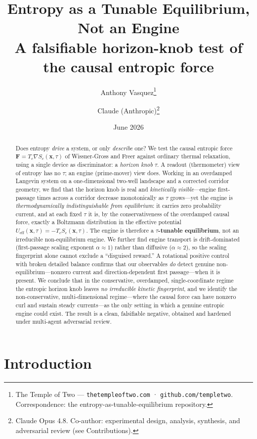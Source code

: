 \documentclass[11pt]{article}
\title{\textbf{Entropy as a Tunable Equilibrium, Not an Engine}\\[0.3em]
\large A falsifiable horizon-knob test of the causal entropic force}
\author{
Anthony Vasquez\thanks{The Temple of Two — \texttt{thetempleoftwo.com} · \texttt{github.com/templetwo}. Correspondence: the entropy-as-tunable-equilibrium repository.}
\and
Claude (Anthropic)\thanks{Claude Opus 4.8. Co-author: experimental design, analysis, synthesis, and adversarial review (see Contributions).}
}
\date{June 2026}
\begin{document}
\maketitle

\begin{abstract}
\noindent
Does entropy \emph{drive} a system, or only \emph{describe} one? We test the causal entropic force $\mathbf{F}=T_c\nabla S_c(\mathbf{x},\tau)$ of Wissner-Gross and Freer against ordinary thermal relaxation, using a single device as discriminator: a \emph{horizon knob} $\tau$. A readout (thermometer) view of entropy has no $\tau$; an engine (prime-mover) view does. Working in an overdamped Langevin system on a one-dimensional two-well landscape and a corrected corridor geometry, we find that the horizon knob is real and \emph{kinetically visible}---engine first-passage times across a corridor decrease monotonically as $\tau$ grows---yet the engine is \emph{thermodynamically indistinguishable from equilibrium}: it carries zero probability current, and at each fixed $\tau$ it is, by the conservativeness of the overdamped causal force, exactly a Boltzmann distribution in the effective potential $U_{\text{eff}}(\mathbf{x},\tau)=-T_c S_c(\mathbf{x},\tau)$. The engine is therefore a \textbf{$\tau$-tunable equilibrium}, not an irreducible non-equilibrium engine. We further find engine transport is drift-dominated (first-passage scaling exponent $\alpha\approx 1$) rather than diffusive ($\alpha\approx 2$), so the scaling fingerprint alone cannot exclude a ``disguised reward.'' A rotational positive control with broken detailed balance confirms that our observables \emph{do} detect genuine non-equilibrium---nonzero current and direction-dependent first passage---when it is present. We conclude that in the conservative, overdamped, single-coordinate regime the entropic horizon knob leaves \emph{no irreducible kinetic fingerprint}, and we identify the non-conservative, multi-dimensional regime---where the causal force can have nonzero curl and sustain steady currents---as the only setting in which a genuine entropic engine could exist. The result is a clean, falsifiable negative, obtained and hardened under multi-agent adversarial review.
\end{abstract}

\section{Introduction}
\end{document}
